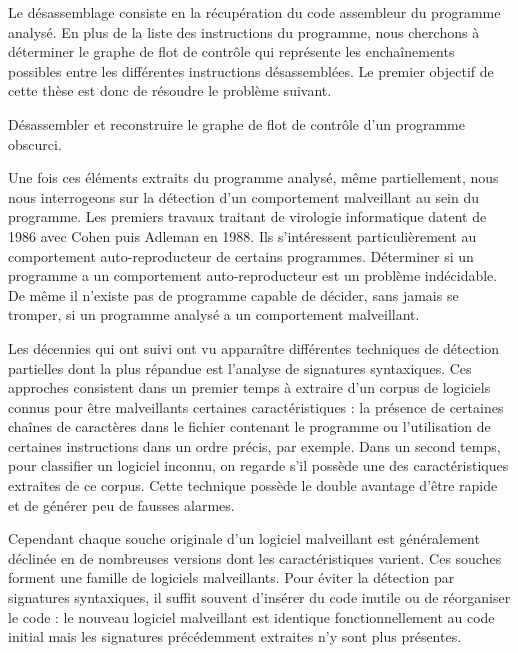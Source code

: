 Le désassemblage consiste en la récupération du code assembleur du programme analysé.
En plus de la liste des instructions du programme, nous cherchons à déterminer le graphe de flot de contrôle qui représente les enchaînements possibles entre les différentes instructions désassemblées.
Le premier objectif de cette thèse est donc de résoudre le problème suivant.

\begin{pbb}
 Désassembler et reconstruire le graphe de flot de contrôle d'un programme obscurci.
\end{pbb}

Une fois ces éléments extraits du programme analysé, même partiellement, nous nous interrogeons sur la détection d'un comportement malveillant au sein du programme.
Les premiers travaux traitant de virologie informatique datent de 1986 avec Cohen \cite{Cohen86} puis Adleman \cite{Adleman88} en 1988. Ils s'intéressent particulièrement au comportement auto-reproducteur de certains programmes. Déterminer si un programme a un comportement auto-reproducteur est un problème indécidable. De même il n'existe pas de programme capable de décider, sans jamais se tromper, si un programme analysé a un comportement malveillant.

Les décennies qui ont suivi ont vu apparaître différentes techniques de détection partielles dont la plus répandue est l'analyse de signatures syntaxiques. Ces approches consistent dans un premier temps à extraire d'un corpus de logiciels connus pour être malveillants certaines caractéristiques : la présence de certaines chaînes de caractères dans le fichier contenant le programme ou l'utilisation de certaines instructions dans un ordre précis, par exemple. Dans un second temps, pour classifier un logiciel inconnu, on regarde s'il possède une des caractéristiques extraites de ce corpus.
Cette technique possède le double avantage d'être rapide et de générer peu de fausses alarmes.

Cependant chaque souche originale d'un logiciel malveillant est généralement déclinée en de nombreuses versions dont les caractéristiques varient. Ces souches forment une famille de logiciels malveillants. Pour éviter la détection par signatures syntaxiques, il suffit souvent d'insérer du code inutile ou de réorganiser le code : le nouveau logiciel malveillant est identique fonctionnellement au code initial mais les signatures précédemment extraites n'y sont plus présentes.

